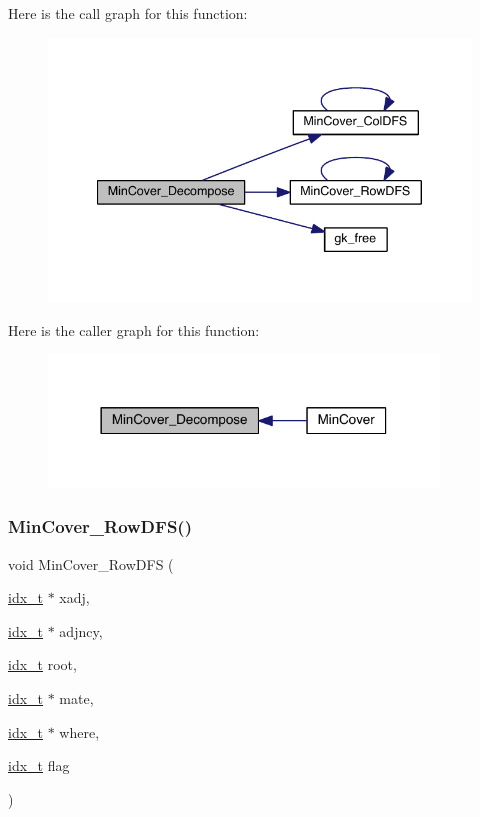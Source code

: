 Here is the call graph for this function\+:\nopagebreak
\begin{figure}[H]
\begin{center}
\leavevmode
\includegraphics[width=340pt]{a00245_ad5ccba21af8f9ed8b2faa69d4503ecfd_cgraph}
\end{center}
\end{figure}
Here is the caller graph for this function\+:\nopagebreak
\begin{figure}[H]
\begin{center}
\leavevmode
\includegraphics[width=294pt]{a00245_ad5ccba21af8f9ed8b2faa69d4503ecfd_icgraph}
\end{center}
\end{figure}
\mbox{\label{a00245_a807020dce58bb03a180aa4a0cb8cdd3e}} 
\subsubsection{\texorpdfstring{Min\+Cover\+\_\+\+Row\+D\+F\+S()}{MinCover\_RowDFS()}}
{\footnotesize\ttfamily void Min\+Cover\+\_\+\+Row\+D\+FS (\begin{DoxyParamCaption}\item[{\hyperlink{a00876_aaa5262be3e700770163401acb0150f52}{idx\+\_\+t} $\ast$}]{xadj,  }\item[{\hyperlink{a00876_aaa5262be3e700770163401acb0150f52}{idx\+\_\+t} $\ast$}]{adjncy,  }\item[{\hyperlink{a00876_aaa5262be3e700770163401acb0150f52}{idx\+\_\+t}}]{root,  }\item[{\hyperlink{a00876_aaa5262be3e700770163401acb0150f52}{idx\+\_\+t} $\ast$}]{mate,  }\item[{\hyperlink{a00876_aaa5262be3e700770163401acb0150f52}{idx\+\_\+t} $\ast$}]{where,  }\item[{\hyperlink{a00876_aaa5262be3e700770163401acb0150f52}{idx\+\_\+t}}]{flag }\end{DoxyParamCaption})}

